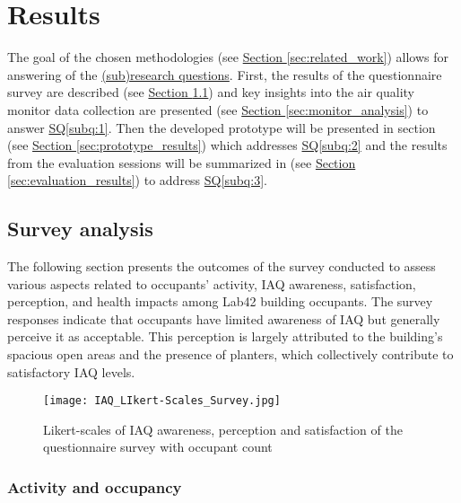 \section{Results}
\label{sec:results}

The goal of the chosen methodologies (see \hyperref[sec:related_work]{Section \ref*{sec:related_work}}) allows for answering of the \hyperref[rq:1]{(sub)research questions}. First, the results of the questionnaire survey are described (see \hyperref[sec:survey_analysis]{Section \ref*{sec:survey_analysis}}) and key insights into the air quality monitor data collection are presented (see \hyperref[sec:monitor_analysis] {Section \ref*{sec:monitor_analysis}}) to answer \hyperref[subq:1]{SQ\ref*{subq:1}}. Then the developed prototype will be presented in section (see \hyperref[sec:prototype_results]{Section \ref*{sec:prototype_results}}) which addresses \hyperref[subq:2]{SQ\ref*{subq:2}} and the results from the evaluation sessions will be summarized in (see \hyperref[sec:evaluation_results]{Section \ref*{sec:evaluation_results}}) to address \hyperref[subq:3]{SQ\ref*{subq:3}}.

\subsection{Survey analysis}
\label{sec:survey_analysis}

The following section presents the outcomes of the survey conducted to assess various aspects related to occupants' activity, IAQ awareness, satisfaction, perception, and health impacts among Lab42 building occupants. The survey responses indicate that occupants have limited awareness of IAQ but generally perceive it as acceptable. This perception is largely attributed to the building's spacious open areas and the presence of planters, which collectively contribute to satisfactory IAQ levels.

\begin{figure}[H]
    \centering
    \texttt{[image: IAQ\_LIkert-Scales\_Survey.jpg]}
    \caption{Likert-scales of IAQ awareness, perception and satisfaction of the questionnaire survey with occupant count}
    \label{fig:complexity}
\end{figure}

\subsubsection{Activity and occupancy}

